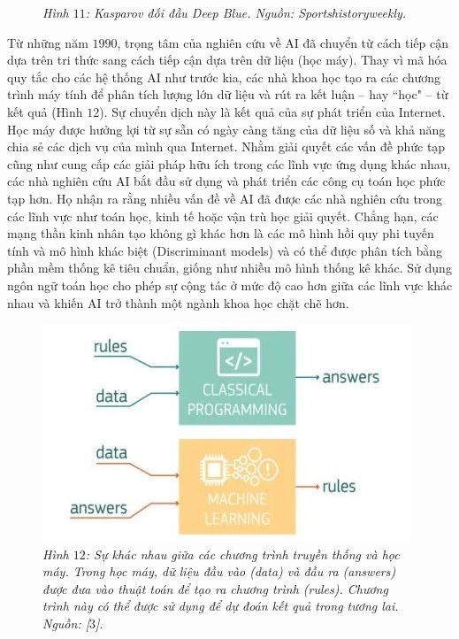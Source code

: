 \begin{multicols}{2}
\begin{figure}[H]
		\caption{\small\textit{\color{cackithi}Hình $11$: Kasparov đối đầu Deep Blue. Nguồn: Sportshistoryweekly.}}
		\vspace*{-10pt}
	\end{figure}
	Từ những năm $1990$, trọng tâm của nghiên cứu về AI đã chuyển từ cách tiếp cận dựa trên tri thức sang cách tiếp cận dựa trên dữ liệu (học máy). Thay vì mã hóa quy tắc cho các hệ thống AI như trước kia, các nhà khoa học tạo ra các chương trình máy tính để phân tích lượng lớn dữ liệu và rút ra kết luận -- hay ``học" -- từ kết quả (Hình $12$). Sự chuyển dịch này là kết quả của sự phát triển của Internet. Học máy được hưởng lợi từ sự sẵn có ngày càng tăng của dữ liệu số và khả năng chia sẻ các dịch vụ của mình qua Internet. 
	\vskip 0.1cm
	Nhằm giải quyết các vấn đề phức tạp cũng như cung cấp các giải pháp hữu ích trong các lĩnh vực ứng dụng khác nhau, các nhà nghiên cứu AI bắt đầu sử dụng và phát triển các công cụ toán học phức tạp hơn. Họ nhận ra rằng nhiều vấn đề về AI đã được các nhà nghiên cứu trong các lĩnh vực như toán học, kinh tế hoặc vận trù học giải quyết. Chẳng hạn, các mạng thần kinh nhân tạo không gì khác hơn là các mô hình hồi quy phi tuyến tính và mô hình khác biệt (Discriminant models) và có thể được phân tích bằng phần mềm thống kê tiêu chuẩn, giống như nhiều mô hình thống kê khác. Sử dụng ngôn ngữ toán học cho phép sự cộng tác ở mức độ cao hơn giữa các lĩnh vực khác nhau và khiến AI trở thành một ngành khoa học chặt chẽ hơn.
	\begin{figure}[H]
		\vspace*{-5pt}
		\centering
		\captionsetup{labelformat= empty, justification=centering}
		\includegraphics[width= 0.9\linewidth]{ML-TraditionalProgramming.jpeg}
		\caption{\small\textit{\color{cackithi}Hình $12$: Sự khác nhau giữa các chương trình truyền thống và học máy. Trong học máy, dữ liệu đầu vào (data) và đầu ra (answers) được đưa vào thuật toán để tạo ra chương trình (rules). Chương trình này có thể được sử dụng để dự đoán kết quả trong tương lai. Nguồn: [$3$].}}

\end{figure}
\end{multicols}

